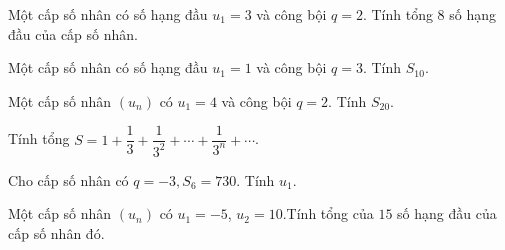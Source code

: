 \begin{bt}%
	Một cấp số nhân có số hạng đầu $u_1=3$ và công bội $q=2 $. Tính tổng $8$ số hạng đầu của cấp số nhân.
\end{bt}

\begin{bt}%
	Một cấp số nhân có số hạng đầu $u_1=1$ và công bội $q=3$. Tính $S_{10}.$
\end{bt}

\begin{bt}%
	Một cấp số nhân $(u_n)$ có $u_1=4$ và công bội $q=2$. Tính $S_{20}$.
\end{bt}

\begin{bt}%
	Tính tổng $S=1+\dfrac{1}{3}+\dfrac{1}{3^2}+\cdots+\dfrac{1}{3^n}+\cdots$.
\end{bt}

\begin{bt}%
	Cho cấp số nhân có $q=-3, S_6=730$. Tính $u_1$.
\end{bt}

\begin{bt}%
	Một cấp số nhân $(u_n)$ có $u_1=-5$, $u_2=10$.Tính tổng của $15$ số hạng đầu của cấp số nhân đó.
\end{bt}

